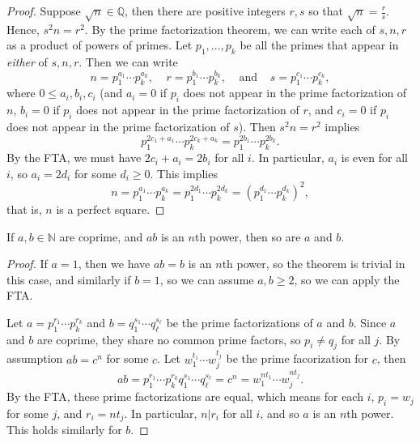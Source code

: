 \documentclass[11pt,dvipsnames]{book}
\numberwithin{equation}{section} %
\numberwithin{figure}{section} %
\numberwithin{table}{section} %
\begin{document}
\begin{proof}
Suppose $\sqrt{n}\in\mathbb{Q}$, then there are positive integers $r,s$ so that $\sqrt{n}=\frac{r}{s}$. Hence, $s^2n=r^2$.  By the prime factorization theorem, we can write each of $s,n,r$ as a product of powers of primes. Let $p_{1},...,p_{k}$ be all the primes that appear in {\it either} of $s,n,r$. Then we can write 
\[
n= p_{1}^{a_{1}}\cdots p_{k}^{a_{k}},
\;\;\;\;
r= p_{1}^{b_{1}}\cdots p_{k}^{b_{k}},\;\;\;\;\mbox{and} 
\;\;\;\;
s= p_{1}^{c_{1}}\cdots p_{k}^{c_{k}},\]
where $0\leq a_{i},b_{i},c_{i}$ (and $a_{i}=0$ if $p_{i}$ does not appear in the prime factorization of $n$, $b_{i}=0$ if $p_{i}$ does not appear in the prime factorization of $r$, and $c_{i}=0$ if $p_{i}$ does not appear in the prime factorization of $s$). Then $s^2n=r^2$ implies
\[
p_{1}^{2c_{1}+a_{1}}\cdots p_{k}^{2c_{k}+a_{k}}=p_{1}^{2b_{1}}\cdots p_{k}^{2b_{k}}.
\]
By the FTA, we must have $2c_{i}+a_{i}=2b_{i}$ for all $i$. In particular, $a_{i}$ is even for all $i$, so $a_{i}=2d_{i}$ for some $d_{i}\geq 0$. This implies
\[
n=p_{1}^{a_{1}}\cdots p_{k}^{a_{k}}=p_{1}^{2d_{1}}\cdots p_{k}^{2d_{k}}
=(p_{1}^{d_{1}}\cdots p_{k}^{d_{k}})^{2},
\]
that is, $n$ is a perfect square. 
\end{proof}

\begin{theorem}
\label{t:abn}
If $a,b\in\mathbb{N}$ are coprime, and $ab$ is an $n$th power, then so are $a$ and $b$.
\end{theorem}

\begin{proof}
 If $a=1$, then we have $ab=b$ is an $n$th power, so the theorem is trivial in this case, and similarly if $b=1$, so we can assume $a,b \geq  2$, so we can apply the FTA.


Let $a=p_{1}^{r_{1}}\cdots p_{k}^{r_{k}}$ and $b=q_{1}^{s_{1}}\cdots q_{\ell}^{s_{\ell}}$ be the prime factorizations of $a$ and $b$. Since $a$ and $b$ are coprime, they share no common prime factors, so $p_{i}\neq q_{j}$ for all $j$.  By assumption $ab=c^n$ for some $c$. Let $w_{1}^{t_{1}}\cdots w_{j}^{t_{j}}$ be the prime facorization for $c$, then 
\[
ab = p_{1}^{r_{1}}\cdots p_{k}^{r_{k}}q_{1}^{s_{1}}\cdots q_{\ell}^{s_{\ell}}
=c^n=w_{1}^{nt_{1}}\cdots w_{j}^{nt_{j}}.
\]
By the FTA,  these prime factorizations are equal, which means for each $i$,  $p_{i}=w_{j}$ for some $j$, and $r_{i}=nt_{j}$. In particular, $n|r_{i}$ for all $i$, and so $a$ is an $n$th power. This holds similarly for $b$. 


\end{proof}
\end{document}
